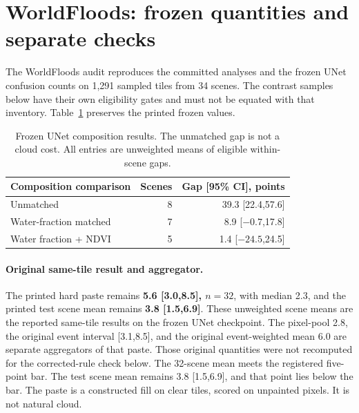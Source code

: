 \section{WorldFloods: frozen quantities and separate checks}
\label{sec:worldfloods}
The WorldFloods audit reproduces the committed analyses and the frozen UNet confusion counts on 1,291 sampled tiles from 34 scenes.
The contrast samples below have their own eligibility gates and must not be equated with that inventory.
Table~\ref{tab:frozen} preserves the printed frozen values.

\begin{table}[t]
\centering\footnotesize
\begin{tabular}{lrr}
\toprule
Composition comparison & Scenes & Gap [95\% CI], points\\
\midrule
Unmatched &8&39.3 [22.4,57.6]\\
Water-fraction matched &7&8.9 [$-0.7$,17.8]\\
Water fraction + NDVI &5&1.4 [$-24.5$,24.5]\\
\bottomrule
\end{tabular}
\caption{Frozen UNet composition results. The unmatched gap is not a cloud cost. All entries are unweighted means of eligible within-scene gaps.}
\label{tab:frozen}
\end{table}

\paragraph{Original same-tile result and aggregator.}
The printed hard paste remains \textbf{5.6 [3.0,8.5], $n=32$}, with median 2.3, and the printed test scene mean remains \textbf{3.8 [1.5,6.9]}.
These unweighted scene means are the reported same-tile results on the frozen UNet checkpoint.
The pixel-pool 2.8, the original event interval [3.1,8.5], and the original event-weighted mean 6.0 are separate aggregators of that paste.
Those original quantities were not recomputed for the corrected-rule check below.
The 32-scene mean meets the registered five-point bar.
The test scene mean remains 3.8 [1.5,6.9], and that point lies below the bar.
The paste is a constructed fill on clear tiles, scored on unpainted pixels.
It is not natural cloud.

